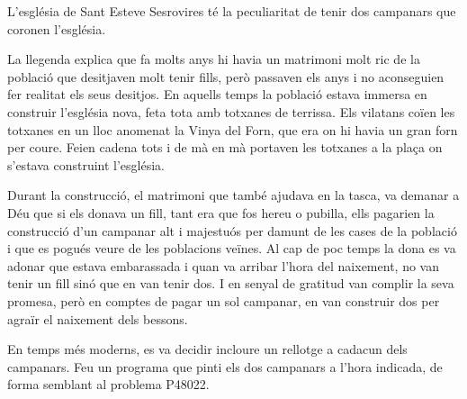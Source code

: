 
\Statement


L'església de Sant Esteve Sesrovires té la peculiaritat de tenir dos campanars que coronen l'església.

\medskip 

La llegenda explica que fa molts anys hi havia un matrimoni molt ric de la població que desitjaven molt tenir fills, però passaven els anys i no aconseguien fer realitat els seus desitjos. En aquells temps la població estava immersa en construir l'es\-glé\-sia nova, feta tota amb totxanes de terrissa. Els vilatans coïen les totxanes en un lloc anomenat la Vinya del Forn, que era on hi havia un gran forn per coure. Feien cadena tots i de mà en mà portaven les totxanes a la plaça on s'estava construint l'església.

\medskip 

Durant la construcció, el matrimoni que també ajudava en la tasca, va demanar a Déu que si els donava un fill, tant era que fos hereu o pubilla, ells pagarien la construcció d'un campanar alt i majestuós per damunt de les cases de la població i que es pogués veure de les poblacions veïnes. Al cap de poc temps la dona es va adonar que estava embarassada i quan va arribar l'hora del naixement, no van tenir un fill sinó que en van tenir dos. I en senyal de gratitud van complir la seva promesa, però en comptes de pagar un sol campanar, en van construir dos per agraïr el naixement dels bessons.

\medskip

En temps més moderns, es va decidir incloure un rellotge a cadacun dels campanars. Feu un programa que pinti els dos campanars a l'hora indicada, de forma semblant al problema P48022.

\Sample